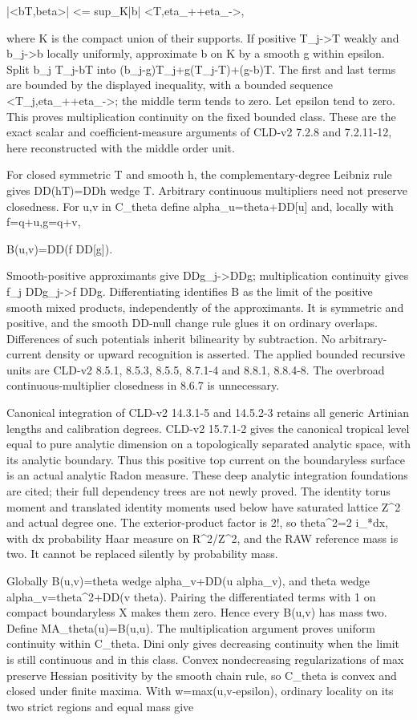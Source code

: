 \documentclass[11pt]{article}
\begin{document}
|<bT,beta>| <= sup\_K|b| <T,eta\_++eta\_->,

where K is the compact union of their supports. If positive T\_j->T weakly and b\_j->b locally uniformly, approximate b on K by a smooth g within epsilon. Split b\_j T\_j-bT into (b\_j-g)T\_j+g(T\_j-T)+(g-b)T. The first and last terms are bounded by the displayed inequality, with a bounded sequence <T\_j,eta\_++eta\_->; the middle term tends to zero. Let epsilon tend to zero. This proves multiplication continuity on the fixed bounded class. These are the exact scalar and coefficient-measure arguments of CLD-v2 7.2.8 and 7.2.11-12, here reconstructed with the middle order unit.

For closed symmetric T and smooth h, the complementary-degree Leibniz rule gives DD(hT)=DDh wedge T. Arbitrary continuous multipliers need not preserve closedness. For u,v in C\_theta define alpha\_u=theta+DD[u] and, locally with f=q+u,g=q+v,

B(u,v)=DD(f DD[g]).

Smooth-positive approximants give DDg\_j->DDg; multiplication continuity gives f\_j DDg\_j->f DDg. Differentiating identifies B as the limit of the positive smooth mixed products, independently of the approximants. It is symmetric and positive, and the smooth DD-null change rule glues it on ordinary overlaps. Differences of such potentials inherit bilinearity by subtraction. No arbitrary-current density or upward recognition is asserted. The applied bounded recursive units are CLD-v2 8.5.1, 8.5.3, 8.5.5, 8.7.1-4 and 8.8.1, 8.8.4-8. The overbroad continuous-multiplier closedness in 8.6.7 is unnecessary.

Canonical integration of CLD-v2 14.3.1-5 and 14.5.2-3 retains all generic Artinian lengths and calibration degrees. CLD-v2 15.7.1-2 gives the canonical tropical level equal to pure analytic dimension on a topologically separated analytic space, with its analytic boundary. Thus this positive top current on the boundaryless surface is an actual analytic Radon measure. These deep analytic integration foundations are cited; their full dependency trees are not newly proved. The identity torus moment and translated identity moments used below have saturated lattice Z\textasciicircum{}2 and actual degree one. The exterior-product factor is 2!, so theta\textasciicircum{}2=2 i\_*dx, with dx probability Haar measure on R\textasciicircum{}2/Z\textasciicircum{}2, and the RAW reference mass is two. It cannot be replaced silently by probability mass.

Globally B(u,v)=theta wedge alpha\_v+DD(u alpha\_v), and theta wedge alpha\_v=theta\textasciicircum{}2+DD(v theta). Pairing the differentiated terms with 1 on compact boundaryless X makes them zero. Hence every B(u,v) has mass two. Define MA\_theta(u)=B(u,u). The multiplication argument proves uniform continuity within C\_theta. Dini only gives decreasing continuity when the limit is still continuous and in this class. Convex nondecreasing regularizations of max preserve Hessian positivity by the smooth chain rule, so C\_theta is convex and closed under finite maxima. With w=max(u,v-epsilon), ordinary locality on its two strict regions and equal mass give
\end{document}

